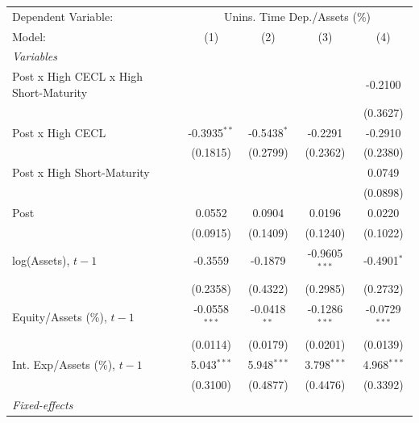 
\begingroup
\centering
\begin{tabular}{lcccc}
   \tabularnewline \midrule \midrule
   Dependent Variable: & \multicolumn{4}{c}{Unins. Time Dep./Assets (\%)}\\
   Model:                                 & (1)             & (2)            & (3)             & (4)\\  
   \midrule
   \emph{Variables}\\
   Post x High CECL x High Short-Maturity &                 &                &                 & -0.2100\\   
                                          &                 &                &                 & (0.3627)\\   
   Post x High CECL                       & -0.3935$^{**}$  & -0.5438$^{*}$  & -0.2291         & -0.2910\\   
                                          & (0.1815)        & (0.2799)       & (0.2362)        & (0.2380)\\   
   Post x High Short-Maturity             &                 &                &                 & 0.0749\\   
                                          &                 &                &                 & (0.0898)\\   
   Post                                   & 0.0552          & 0.0904         & 0.0196          & 0.0220\\   
                                          & (0.0915)        & (0.1409)       & (0.1240)        & (0.1022)\\   
   log(Assets), $t{-}1$                   & -0.3559         & -0.1879        & -0.9605$^{***}$ & -0.4901$^{*}$\\   
                                          & (0.2358)        & (0.4322)       & (0.2985)        & (0.2732)\\   
   Equity/Assets (\%), $t{-}1$            & -0.0558$^{***}$ & -0.0418$^{**}$ & -0.1286$^{***}$ & -0.0729$^{***}$\\   
                                          & (0.0114)        & (0.0179)       & (0.0201)        & (0.0139)\\   
   Int. Exp/Assets (\%), $t{-}1$          & 5.043$^{***}$   & 5.948$^{***}$  & 3.798$^{***}$   & 4.968$^{***}$\\   
                                          & (0.3100)        & (0.4877)       & (0.4476)        & (0.3392)\\   
   \midrule
   \emph{Fixed-effects}\\

\end{tabular}
